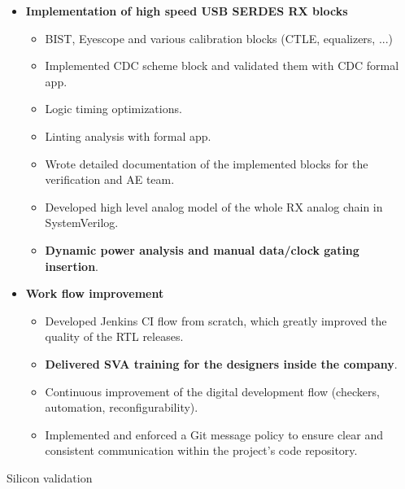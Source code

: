\begin{cventries}
{\begin{cvitems}
\begin{itemize}
\begin{itemize}
            \item {Effectively interfaced with external Design Verification (DV) contractors to ensure seamless integration of their deliverables into the project, resulting in successful project completion.}
          \end{itemize}
          \item {\textbf{Implementation of high speed USB SERDES RX blocks}}
          \begin{itemize}
            \item {BIST, Eyescope and various calibration blocks (CTLE, equalizers, ...)}
            \item {Implemented CDC scheme block and validated them with CDC formal app.}
            \item {Logic timing optimizations.}
            \item {Linting analysis with formal app.}
            \item {Wrote detailed documentation of the implemented blocks for the verification and AE team.}
            \item {Developed high level analog model of the whole RX analog chain in SystemVerilog.}
            \item {\textbf{Dynamic power analysis and manual data/clock gating insertion}.}
          \end{itemize}
          \item {\textbf{Work flow improvement}}
          \begin{itemize}
            \item {Developed Jenkins CI flow from scratch, which greatly improved the quality of the RTL releases.}
            \item {\textbf{Delivered SVA training for the designers inside the company}.}
            \item {Continuous improvement of the digital development flow (checkers, automation, reconfigurability).}
            \item {Implemented and enforced a Git message policy to ensure clear and consistent communication within the project's code repository.}
          \end{itemize}
        \end{itemize}
        \item {Silicon validation}

\end{cvitems}}
\end{cventries}
